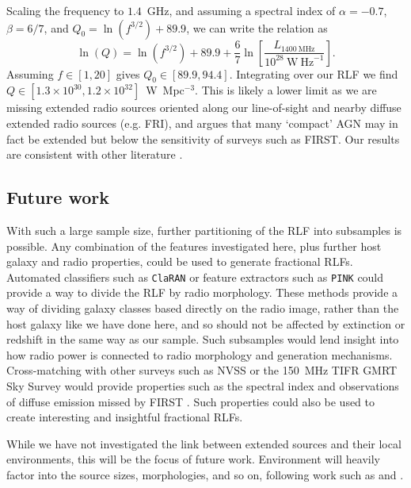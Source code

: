       Scaling the frequency to $1.4$~GHz, and assuming a spectral index of $\alpha = -0.7$, $\beta = 6/7$, and $Q_0 = \ln (f^{3/2}) + 89.9$, we can write the \citet{willott99radio} relation as
      \begin{equation}
        \ln (Q) = \ln (f^{3/2}) + 89.9 + \frac{6}{7} \ln \left[\frac{L_{1400~\mathrm{MHz}}}{10^{28}~\mathrm{W\ Hz}^{-1}}\right].
      \end{equation}
      Assuming $f \in [1, 20]$ gives $Q_0 \in [89.9, 94.4]$. Integrating over our RLF we find $Q \in [1.3 \times 10^{30}, 1.2 \times 10^{32}]$~W~Mpc$^{-3}$. This is likely a lower limit as we are missing extended radio sources oriented along our line-of-sight and nearby diffuse extended radio sources (e.g. FRI), and \citet{shabala18plane} argues that many `compact' AGN may in fact be extended but below the sensitivity of surveys such as FIRST. Our results are consistent with other literature \citep[e.g.][who estimated the energy contribution as $7 \times 10^{31}$ W~Mpc$^{-3}$]{hardcastle19rlagn}. 

  \subsection{Future work}

    With such a large sample size, further partitioning of the RLF into subsamples is possible. Any combination of the features investigated here, plus further host galaxy and radio properties, could be used to generate fractional RLFs. Automated classifiers such as \texttt{ClaRAN} \citep{wu19claran} or feature extractors such as \texttt{PINK} \citep{polsterer15pink,galvin19som,ralph19ae} could provide a way to divide the RLF by radio morphology. These methods provide a way of dividing galaxy classes based directly on the radio image, rather than the host galaxy like we have done here, and so should not be affected by extinction or redshift in the same way as our sample. Such subsamples would lend insight into how radio power is connected to radio morphology and generation mechanisms. Cross-matching with other surveys such as NVSS or the 150~MHz TIFR GMRT Sky Survey would provide properties such as the spectral index and observations of diffuse emission missed by FIRST \citep[as used by][]{kimball08}. Such properties could also be used to create interesting and insightful fractional RLFs.

    While we have not investigated the link between extended sources and their local environments, this will be the focus of future work. Environment will heavily factor into the source sizes, morphologies, and so on, following work such as \citet{rodman19asymmetry} and \citet{garon19bending}.

